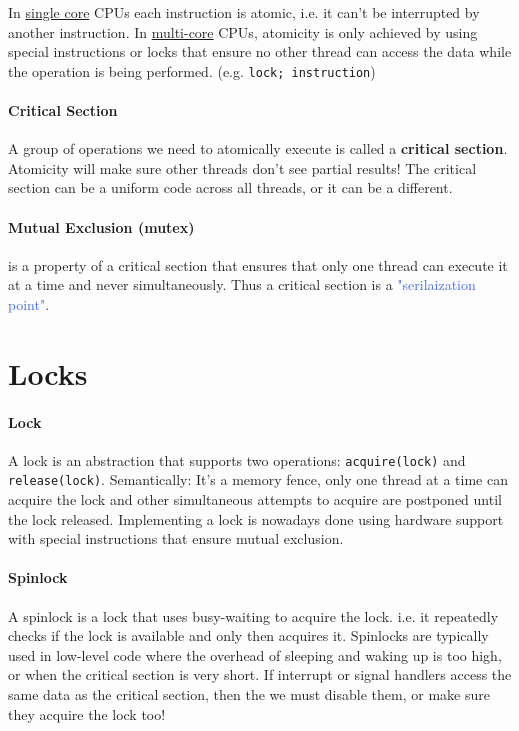 \documentclass[openany,12pt]{book}
\newcommand{\code}[1]{\texttt{#1}}
\newcommand{\blue}[1]{\textcolor{RoyalBlue}{#1}}
\begin{document}
In \ul{single core} CPUs each instruction is atomic, i.e. it can't be interrupted by another instruction. In \ul{multi-core} CPUs, atomicity is only achieved by using special instructions or locks that ensure no other thread can access the data while the operation is being performed. (e.g. \code{lock; instruction})


\paragraph{Critical Section} A group of operations we need to atomically execute is called a \textbf{critical section}. Atomicity will make sure other threads don't see partial results! The critical section can be a uniform code across all threads, or it can be a different.

\paragraph{Mutual Exclusion (mutex)} is a property of a critical section that ensures that only one thread can execute it at a time and never simultaneously. Thus a critical section is a \blue{"serilaization point"}.



\section*{Locks}

\paragraph{Lock} A lock is an abstraction that supports two operations: \code{acquire(lock)} and \code{release(lock)}.
Semantically: It's a memory fence, only one thread at a time can acquire the lock and other simultaneous attempts to acquire are postponed until the lock released. Implementing a lock is nowadays done using hardware support with special instructions that ensure mutual exclusion.

\paragraph{Spinlock} A spinlock is a lock that uses busy-waiting to acquire the lock. i.e. it repeatedly checks if the lock is available and only then acquires it. Spinlocks are typically used in low-level code where the overhead of sleeping and waking up is too high, or when the critical section is very short. If interrupt or signal handlers access the same data as the critical section, then the we must disable them, or make sure they acquire the lock too!
\end{document}

